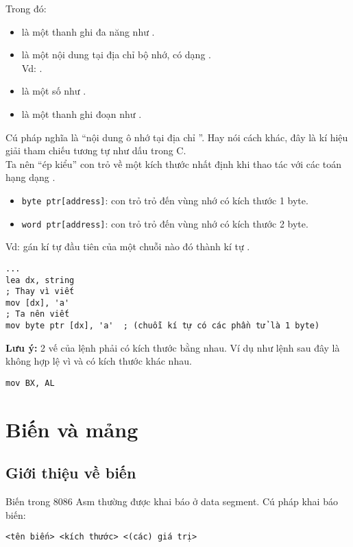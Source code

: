 \documentclass[main.tex]{subfiles}
\begin{document}
Trong đó:
\begin{itemize}
    \item {} là một thanh ghi đa năng như .
    \item {} là một nội dung tại địa chỉ bộ nhớ, có dạng \cd{[address]}.\\Vd: \cd{[0DEADh], [0BEEFh], [0CAFEh], [BX], [DX]}.
    \item {} là một số như .
    \item {} là một thanh ghi đoạn như .
\end{itemize}

Cú pháp \cd{[adress]} nghĩa là ``nội dung ô nhớ tại địa chỉ ''. Hay nói cách khác, đây là kí hiệu giải tham chiếu tương tự như dấu \cd{*} trong C.\\
Ta nên ``ép kiểu'' con trỏ về một kích thước nhất định khi thao tác với các toán hạng dạng \cd{[address]}.
\begin{itemize}
    \item \texttt{byte ptr[address]}: con trỏ trỏ đến vùng nhớ có kích thước 1 byte.
    \item \texttt{word ptr[address]}: con trỏ trỏ đến vùng nhớ có kích thước 2 byte.
\end{itemize}
Vd: gán kí tự đầu tiên của một chuỗi nào đó thành kí tự .
\begin{verbatim}
... 
lea dx, string         
; Thay vì viết
mov [dx], 'a'
; Ta nên viết 
mov byte ptr [dx], 'a'  ; (chuỗi kí tự có các phần tử là 1 byte)     
\end{verbatim}

\textbf{Lưu ý:} 2 vế của lệnh  phải có kích thước bằng nhau. Ví dụ như lệnh sau đây là không hợp lệ vì  và  có kích thước khác nhau.
\begin{verbatim}
mov BX, AL
\end{verbatim}

\section{Biến và mảng}
\subsection{Giới thiệu về biến}
Biến trong 8086 Asm thường được khai báo ở data segment.
Cú pháp khai báo biến:
\begin{verbatim}
<tên biến> <kích thước> <(các) giá trị>
\end{verbatim}
\end{document}
